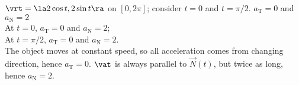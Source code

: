 {$\vrt = \la 2\cos t,2\sin t \ra$ on $[0,2\pi]$; consider $t=0$ and $t=\pi/2$.
}
{$a_{\text{T}} = 0$ and $a_{\text{N}} = 2$\\
At $t=0$, $a_{\text{T}} = 0$ and $a_{\text{N}} = 2$;\\
At $t=\pi/2$, $a_{\text{T}} = 0$ and $a_{\text{N}} = 2$.\\
The object moves at constant speed, so all acceleration comes from changing direction, hence $a_{\text{T}}=0$. $\vat$ is always parallel to $\vec N(t)$, but twice as long, hence $a_{\text{N}}=2$.
}